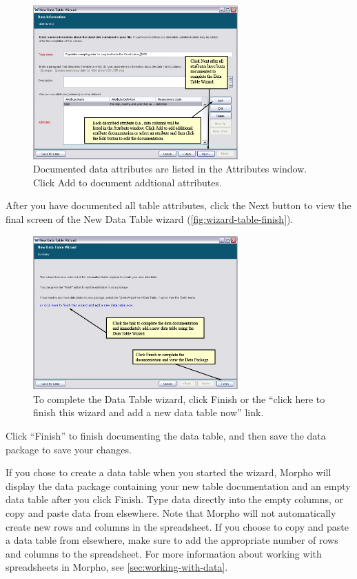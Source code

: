 \begin{figure}
  \centering
    \includegraphics[width=0.7\textwidth]{images/wizard-table-info.jpg}
  \caption{Documented data attributes are listed in the Attributes
    window. Click Add to document addtional attributes.}
  \label{fig:wizard-table-info}
\end{figure}

After you have documented all table attributes, click the Next button to
view the final screen of the New Data Table wizard
(\autoref{fig:wizard-table-finish}).

\begin{figure}
  \centering
    \includegraphics[width=0.7\textwidth]{images/wizard-table-finish}
  \caption{To complete the Data Table wizard, click Finish or the
    ``click here to finish this wizard and add a new data table now''
    link.}
  \label{fig:wizard-table-finish}
\end{figure}

Click ``Finish'' to finish documenting the data table, and then save the
data package to save your changes. 

If you chose to create a data table when you started the wizard, Morpho
will display the data package containing your new table documentation
and an empty data table after you click Finish. Type data directly into
the empty columns, or copy and paste data from elsewhere. Note that
Morpho will not automatically create new rows and columns in the
spreadsheet. If you choose to copy and paste a data table from
elsewhere, make sure to add the appropriate number of rows and columns
to the spreadsheet. For more information about working with spreadsheets
in Morpho, see \autoref{sec:working-with-data}.

